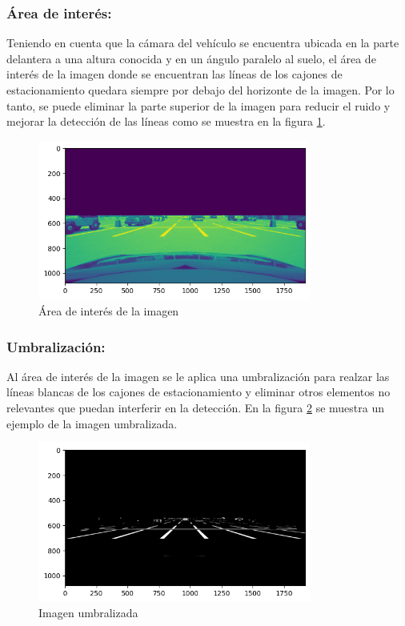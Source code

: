 \subsubsection{Área de interés:}
\noindent
Teniendo en cuenta que la cámara del vehículo se encuentra ubicada en la parte delantera a una altura conocida y en un ángulo paralelo al suelo, el área de interés de la imagen donde se encuentran las líneas de los cajones de estacionamiento quedara siempre por debajo del horizonte de la imagen.
Por lo tanto, se puede eliminar la parte superior de la imagen para
reducir el ruido y mejorar la detección de las líneas como se muestra en la figura \ref{fig:roi}. \\
\begin{figure}[!ht]
    \centering
    \includegraphics[width=0.8\textwidth]{img/reticule/horizont}
    \caption{Área de interés de la imagen}
    \label{fig:roi}
\end{figure}

\subsubsection{Umbralización:}
\noindent
Al área de interés de la imagen se le aplica una umbralización para realzar las líneas blancas de los cajones de estacionamiento
y eliminar otros elementos no relevantes que puedan interferir en la detección.
En la figura \ref{fig:threshold} se muestra un ejemplo de la imagen umbralizada.
\begin{figure}[!ht]
    \centering
    \includegraphics[width=0.8\textwidth]{img/reticule/thresholded}
    \caption{Imagen umbralizada}
    \label{fig:threshold}
\end{figure}

